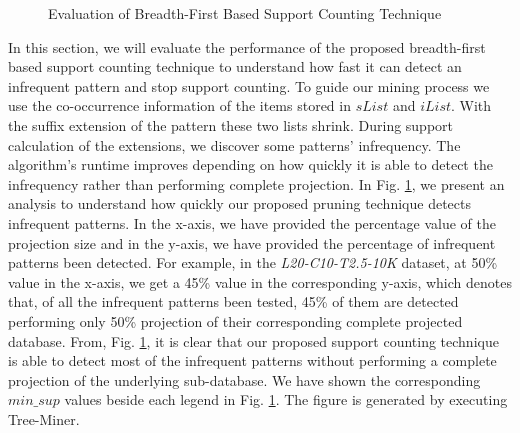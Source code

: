 \begin{figure}[ht]
\begin{adjustbox}{max width=1\textwidth}
           \end{adjustbox}
         \caption{Evaluation of Breadth-First Based Support Counting Technique}
        \label{graph:breadth-first-support}
\end{figure}

In this section, we will evaluate the performance of the proposed breadth-first based support counting technique to understand how fast it can detect an infrequent pattern and stop support counting. To guide our mining process we use the co-occurrence information of the items stored in $sList$ and $iList$. With the suffix extension of the pattern these two lists shrink. During support calculation of the extensions, we discover some patterns' infrequency. The algorithm's runtime improves depending on how quickly it is able to detect the infrequency rather than performing complete projection. In Fig. \ref{graph:breadth-first-support}, we present an analysis to understand how quickly our proposed pruning technique detects infrequent patterns. In the x-axis, we have provided the percentage value of the projection size and in the y-axis, we have provided the percentage of infrequent patterns been detected. For example, in the \textit{L20-C10-T2.5-10K} dataset, at 50\% value in the x-axis, we get a 45\% value in the corresponding y-axis, which denotes that, of all the infrequent patterns been tested, 45\% of them are detected performing only 50\% projection of their corresponding complete projected database. From, Fig. \ref{graph:breadth-first-support}, it is clear that our proposed support counting technique is able to detect most of the infrequent patterns without performing a complete projection of the underlying sub-database. We have shown the corresponding $min\_sup$ values beside each legend in Fig. \ref{graph:breadth-first-support}.  The figure is generated by executing Tree-Miner.



